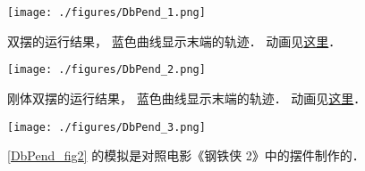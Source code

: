 
\begin{issues}
\issueDraft
\end{issues}


\begin{figure}[ht]
\centering
\texttt{[image: ./figures/DbPend\_1.png]}
\caption{双摆的运行结果， 蓝色曲线显示末端的轨迹． 动画见\href{https://wuli.wiki/apps/DbPend.html}{这里}．} \label{DbPend_fig1}
\end{figure}

\begin{figure}[ht]
\centering
\texttt{[image: ./figures/DbPend\_2.png]}
\caption{刚体双摆的运行结果， 蓝色曲线显示末端的轨迹． 动画见\href{https://wuli.wiki/apps/RigDbPend.html}{这里}．} \label{DbPend_fig2}
\end{figure}

\begin{figure}[ht]
\centering
\texttt{[image: ./figures/DbPend\_3.png]}
\caption{\autoref{DbPend_fig2} 的模拟是对照电影《钢铁侠 2》中的摆件制作的．} \label{DbPend_fig3}
\end{figure}


